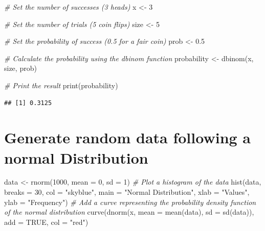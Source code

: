 \documentclass[]{tufte-handout}
\newenvironment{Shaded}{}{}
\newcommand{\AttributeTok}[1]{\textcolor[rgb]{0.49,0.56,0.16}{#1}}
\newcommand{\CommentTok}[1]{\textcolor[rgb]{0.38,0.63,0.69}{\textit{#1}}}
\newcommand{\ConstantTok}[1]{\textcolor[rgb]{0.53,0.00,0.00}{#1}}
\newcommand{\DecValTok}[1]{\textcolor[rgb]{0.25,0.63,0.44}{#1}}
\newcommand{\FloatTok}[1]{\textcolor[rgb]{0.25,0.63,0.44}{#1}}
\newcommand{\FunctionTok}[1]{\textcolor[rgb]{0.02,0.16,0.49}{#1}}
\newcommand{\NormalTok}[1]{#1}
\newcommand{\OtherTok}[1]{\textcolor[rgb]{0.00,0.44,0.13}{#1}}
\newcommand{\StringTok}[1]{\textcolor[rgb]{0.25,0.44,0.63}{#1}}
\begin{document}
\begin{Shaded}
\begin{Highlighting}[]
\CommentTok{\# Set the number of successes (3 heads)}
\NormalTok{x }\OtherTok{\textless{}{-}} \DecValTok{3}

\CommentTok{\# Set the number of trials (5 coin flips)}
\NormalTok{size }\OtherTok{\textless{}{-}} \DecValTok{5}

\CommentTok{\# Set the probability of success (0.5 for a fair coin)}
\NormalTok{prob }\OtherTok{\textless{}{-}} \FloatTok{0.5}

\CommentTok{\# Calculate the probability using the dbinom function}
\NormalTok{probability }\OtherTok{\textless{}{-}} \FunctionTok{dbinom}\NormalTok{(x, size, prob)}

\CommentTok{\# Print the result}
\FunctionTok{print}\NormalTok{(probability)}
\end{Highlighting}
\end{Shaded}

\begin{verbatim}
## [1] 0.3125
\end{verbatim}

\hypertarget{generate-random-data-following-a-normal-distribution}{%
\section{Generate random data following a normal
Distribution}\label{generate-random-data-following-a-normal-distribution}}

\begin{Shaded}
\begin{Highlighting}[]
\NormalTok{data }\OtherTok{\textless{}{-}} \FunctionTok{rnorm}\NormalTok{(}\DecValTok{1000}\NormalTok{, }\AttributeTok{mean =} \DecValTok{0}\NormalTok{, }\AttributeTok{sd =} \DecValTok{1}\NormalTok{)}
\CommentTok{\# Plot a histogram of the data}
\FunctionTok{hist}\NormalTok{(data, }\AttributeTok{breaks =} \DecValTok{30}\NormalTok{, }\AttributeTok{col =} \StringTok{"skyblue"}\NormalTok{, }\AttributeTok{main =} \StringTok{"Normal Distribution"}\NormalTok{, }\AttributeTok{xlab =} \StringTok{"Values"}\NormalTok{, }\AttributeTok{ylab =} \StringTok{"Frequency"}\NormalTok{)}
\CommentTok{\# Add a curve representing the probability density function of the normal distribution}
\FunctionTok{curve}\NormalTok{(}\FunctionTok{dnorm}\NormalTok{(x, }\AttributeTok{mean =} \FunctionTok{mean}\NormalTok{(data), }\AttributeTok{sd =} \FunctionTok{sd}\NormalTok{(data)), }\AttributeTok{add =} \ConstantTok{TRUE}\NormalTok{, }\AttributeTok{col =} \StringTok{"red"}\NormalTok{)}
\end{Highlighting}
\end{Shaded}
\end{document}
